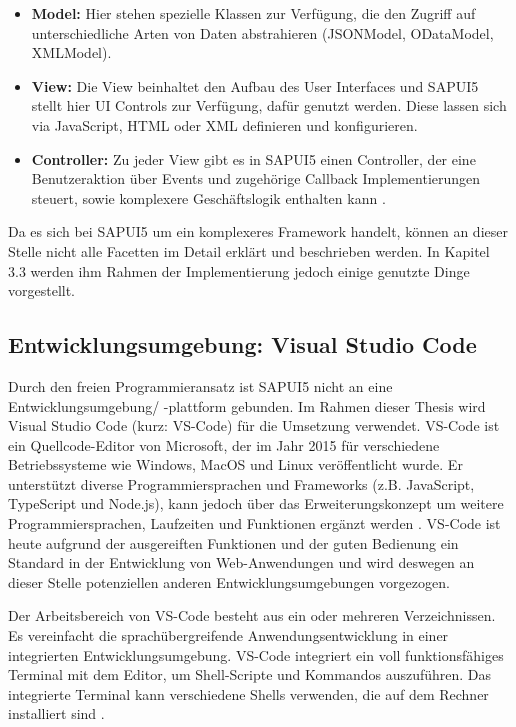 \begin{itemize}[noitemsep]
\item \textbf{Model:} Hier stehen spezielle Klassen zur Verfügung, die den Zugriff auf unterschiedliche Arten von Daten abstrahieren (JSONModel, ODataModel, XMLModel).
\item \textbf{View:} Die View beinhaltet den Aufbau des User Interfaces und SAPUI5 stellt hier UI Controls zur Verfügung, dafür genutzt werden. Diese lassen sich via JavaScript, HTML oder XML definieren und konfigurieren.
\item \textbf{Controller:} Zu jeder View gibt es in SAPUI5 einen Controller, der eine Benutzeraktion über Events und zugehörige Callback Implementierungen steuert, sowie komplexere Geschäftslogik enthalten kann \cite[S.149]{sapui5}.
\end{itemize}

Da es sich bei SAPUI5 um ein komplexeres Framework handelt, können an dieser Stelle nicht alle Facetten im Detail erklärt und beschrieben werden. In Kapitel 3.3 werden ihm Rahmen der Implementierung jedoch einige genutzte Dinge vorgestellt.

\subsection{Entwicklungsumgebung: Visual Studio Code}
Durch den freien Programmieransatz ist SAPUI5 nicht an eine Entwicklungsumgebung/ -plattform gebunden. Im Rahmen dieser Thesis wird Visual Studio Code (kurz: VS-Code) für die Umsetzung verwendet. VS-Code ist ein Quellcode-Editor von Microsoft, der im Jahr 2015 für verschiedene Betriebssysteme wie Windows, MacOS und Linux veröffentlicht wurde. Er unterstützt diverse Programmiersprachen und Frameworks (z.B. JavaScript, TypeScript und Node.js), kann jedoch über das Erweiterungskonzept um weitere Programmiersprachen, Laufzeiten und Funktionen ergänzt werden \cite{vsc:ov}. VS-Code ist heute aufgrund der ausgereiften Funktionen und der guten Bedienung ein Standard in der Entwicklung von Web-Anwendungen \cite{wiki:vsc} und wird deswegen an dieser Stelle potenziellen anderen Entwicklungsumgebungen vorgezogen.

Der Arbeitsbereich von VS-Code besteht aus ein oder mehreren Verzeichnissen. Es vereinfacht die sprachübergreifende Anwendungsentwicklung in einer integrierten Entwicklungsumgebung. VS-Code integriert ein voll funktionsfähiges Terminal mit dem Editor, um Shell-Scripte und Kommandos auszuführen. Das integrierte Terminal kann verschiedene Shells verwenden, die auf dem Rechner installiert sind \cite{vsc:tb}.

